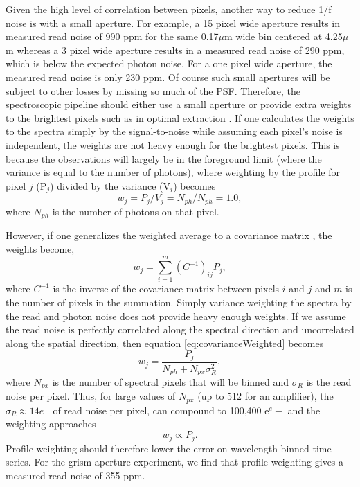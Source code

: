 \documentclass{aastex62}
\begin{document}
Given the high level of correlation between pixels, another way to reduce 1/f noise is with a small aperture.
For example, a 15 pixel wide aperture results in measured read noise of 990 ppm for the same 0.17$\mu$m wide bin centered at 4.25$\mu$m whereas a 3 pixel wide aperture results in a measured read noise of 290 ppm, which is below the expected photon noise.
For a one pixel wide aperture, the measured read noise is only 230 ppm.
Of course such small apertures will be subject to other losses by missing so much of the PSF.
Therefore, the spectroscopic pipeline should either use a small aperture or provide extra weights to the brightest pixels such as in optimal extraction \citep[e.g.][]{horne1986optimalE}.
If one calculates the weights to the spectra simply by the signal-to-noise while assuming each pixel's noise is independent, the weights are not heavy enough for the brightest pixels.
This is because the observations will largely be in the foreground limit (where the variance is equal to the number of photons), where weighting by the profile for pixel $j$ (P$_j$) divided by the variance (V$_i$) becomes
\begin{equation}
w_j = P_j / V_j = N_{ph} / N_{ph} = 1.0,
\end{equation}
where $N_{ph}$ is the number of photons on that pixel.

However, if one generalizes the weighted average to a covariance matrix \citep{schmelling1995averagingCorrelatedData}, the weights become,
\begin{equation}
w_j = \sum_{i=1}^{m} \left( C^{-1}\right)_{ij} P_j,\label{eq:covarianceWeighted}
\end{equation}
where $C^{-1}$ is the inverse of the covariance matrix between pixels $i$ and $j$ and $m$ is the number of pixels in the summation.
Simply variance weighting the spectra by the read and photon noise does not provide heavy enough weights.
If we assume the read noise is perfectly correlated along the spectral direction and uncorrelated along the spatial direction, then equation \ref{eq:covarianceWeighted} becomes
\begin{equation}
w_j = \frac{P_j}{N_{ph} + N_{px} \sigma_R^2},
\end{equation}
where $N_{px}$ is the number of spectral pixels that will be binned and $\sigma_R$ is the read noise per pixel.
Thus, for large values of $N_{px}$ (up to 512 for an amplifier), the $\sigma_R \approx 14e^-$ of read noise per pixel, can compound to 100,400 e$^e-$ and the weighting approaches
\begin{equation}
w_j \propto P_j.
\end{equation}
Profile weighting should therefore lower the error on wavelength-binned time series.
For the grism aperture experiment, we find that profile weighting gives a measured read noise of 355 ppm.
\end{document}
